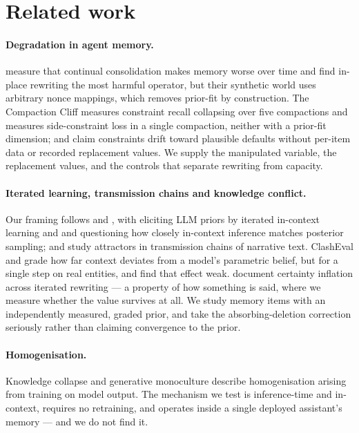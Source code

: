 \section{Related work}

\paragraph{Degradation in agent memory.} \citet{zhang2026faulty} measure that continual consolidation
makes memory worse over time and find in-place rewriting the most harmful operator, but their
synthetic world uses arbitrary nonce mappings, which removes prior-fit by construction. The Compaction Cliff \citep{compactioncliff2026} measures constraint recall collapsing over five
compactions and \citet{compint2026} measures side-constraint loss in a single compaction, neither
with a prior-fit dimension; and \citet{zahn2026facts} claim constraints drift toward plausible defaults
without per-item data or recorded replacement values. We supply the manipulated variable, the
replacement values, and the controls that separate rewriting from capacity.

\paragraph{Iterated learning, transmission chains and knowledge conflict.} Our framing follows
\citet{griffiths2007language} and \citet{kirby2007innateness}, with \citet{zhu2025eliciting}
eliciting LLM priors by iterated in-context learning and \citet{ren2024iterated} and
\citet{cui2025sharper} questioning how closely in-context inference matches posterior sampling;
\citet{perez2025cultural} and \citet{acerbi2023large} study attractors in transmission chains of
narrative text. ClashEval \citep{clasheval2024} and \citet{xie2024adaptive} grade how far context deviates from a
model's parametric belief, but for a single step on real entities, and \citet{kochelka2026weak} find
that effect weak. \citet{belem2026may} document certainty inflation across iterated rewriting --- a
property of how something is said, where we measure whether the value survives at all. We study memory
items with an independently measured, graded prior, and take the absorbing-deletion correction
seriously rather than claiming convergence to the prior.

\paragraph{Homogenisation.} Knowledge collapse \citep{peterson2024knowledge} and generative
monoculture \citep{wu2024monoculture} describe homogenisation arising from training on model output.
The mechanism we test is inference-time and in-context, requires no retraining, and operates inside a
single deployed assistant's memory --- and we do not find it.
